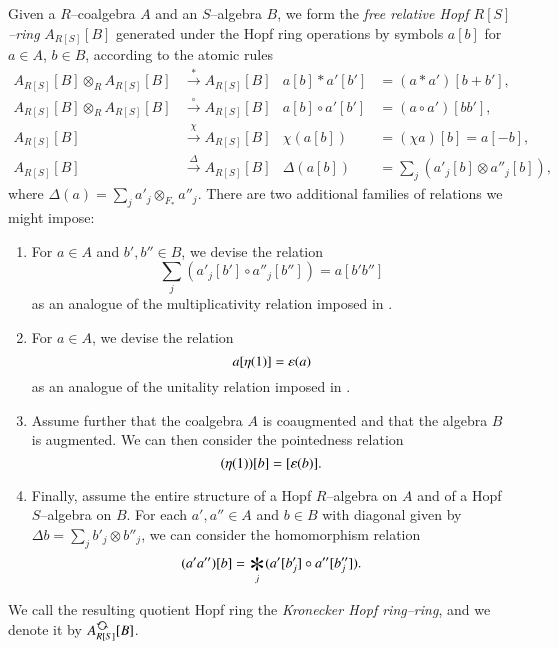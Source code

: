 \begin{definition}\label{DefnAlgebraicModelOfCoopns}
Given a $R$--coalgebra $A$ and an $S$--algebra $B$, we form the \textit{free relative Hopf $R[S]$--ring} $A_{R[S]}[B]$ generated under the Hopf ring operations by symbols $a[b]$ for $a \in A$, $b \in B$, according to the atomic rules
\begin{align*}
A_{R[S]}[B] \otimes_R A_{R[S]}[B] & \xrightarrow{\ast} A_{R[S]}[B] &
a[b] \ast a'[b'] & = (a \ast a') [b + b'], \\
A_{R[S]}[B] \otimes_R A_{R[S]}[B] & \xrightarrow{\circ} A_{R[S]}[B] &
a[b] \circ a'[b'] & = (a \circ a') [b b'], \\
A_{R[S]}[B] & \xrightarrow{\chi} A_{R[S]}[B] &
\chi(a[b]) & = (\chi a)[b] = a[-b], \\
A_{R[S]}[B] & \xrightarrow{\Delta} A_{R[S]}[B] &
\Delta(a[b]) & = \sum_j (a'_j[b] \otimes a''_j[b]),
\end{align*}
where $\Delta(a) = \sum_j a'_j \otimes_{F_*} a''_j$.  There are two additional families of relations we might impose:
\begin{enumerate}
    \item For $a \in A$ and $b', b'' \in B$, we devise the relation \[\sum_j (a'_j[b'] \circ a''_j[b'']) = a[b'b'']\] as an analogue of the multiplicativity relation imposed in .
    \item For $a \in A$, we devise the relation \[a[\eta(1)] = \varepsilon(a)\] as an analogue of the unitality relation imposed in .
    \item Assume further that the coalgebra $A$ is coaugmented and that the algebra $B$ is augmented.  We can then consider the pointedness relation \[(\eta(1))[b] = [\varepsilon(b)].\]
    \item Finally, assume the entire structure of a Hopf $R$--algebra on $A$ and of a Hopf $S$--algebra on $B$.  For each $a', a'' \in A$ and $b \in B$ with diagonal given by $\Delta b = \sum_j b'_j \otimes b''_j$, we can consider the homomorphism relation \[(a'a'')[b] = \bigast_j (a'[b'_j] \circ a''[b''_j]).\]
\end{enumerate}
We call the resulting quotient Hopf ring the \textit{Kronecker Hopf ring--ring}, and we denote it by $A_{R[S]}^{\circulatearrows}[B]$.
\end{definition}

